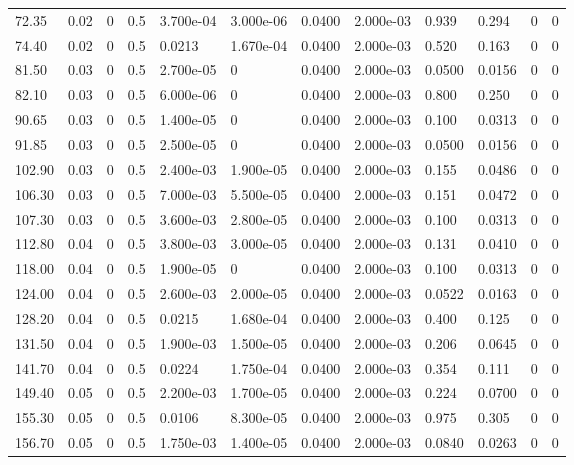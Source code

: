 \documentclass[preview]{standalone}
\begin{document}
{{\begin{tabular}{L{1.2cm}C{1.2cm} C{0.3cm}C{0.5cm} C{1.4cm}C{1.4cm} C{1.4cm}C{1.4cm} C{1.6cm}C{1.6cm} C{1.6cm}C{1.6cm}}
  72.35  &  0.02  & 0     & 0.5 &  3.700e-04  & 3.000e-06  &  0.0400&   2.000e-03& 0.939 & 0.294   &  0 & 0  \\ 
  74.40  &  0.02  & 0     & 0.5 &  0.0213  & 1.670e-04  &  0.0400&   2.000e-03& 0.520 & 0.163   &  0 & 0  \\ 
  81.50  &  0.03  & 0     & 0.5 &  2.700e-05  & 0  &  0.0400&   2.000e-03& 0.0500 & 0.0156   &  0 & 0  \\ 
  82.10  &  0.03  & 0     & 0.5 &  6.000e-06  & 0  &  0.0400&   2.000e-03& 0.800 & 0.250   &  0 & 0  \\ 
  90.65  &  0.03  & 0     & 0.5 &  1.400e-05  & 0  &  0.0400&   2.000e-03& 0.100 & 0.0313   &  0 & 0  \\ 
  91.85  &  0.03  & 0     & 0.5 &  2.500e-05  & 0  &  0.0400&   2.000e-03& 0.0500 & 0.0156   &  0 & 0  \\ 
  102.90  &  0.03  & 0     & 0.5 &  2.400e-03  & 1.900e-05  &  0.0400&   2.000e-03& 0.155 & 0.0486   &  0 & 0  \\ 
  106.30  &  0.03  & 0     & 0.5 &  7.000e-03  & 5.500e-05  &  0.0400&   2.000e-03& 0.151 & 0.0472   &  0 & 0  \\ 
  107.30  &  0.03  & 0     & 0.5 &  3.600e-03  & 2.800e-05  &  0.0400&   2.000e-03& 0.100 & 0.0313   &  0 & 0  \\ 
  112.80  &  0.04  & 0     & 0.5 &  3.800e-03  & 3.000e-05  &  0.0400&   2.000e-03& 0.131 & 0.0410   &  0 & 0  \\ 
  118.00  &  0.04  & 0     & 0.5 &  1.900e-05  & 0  &  0.0400&   2.000e-03& 0.100 & 0.0313   &  0 & 0  \\ 
  124.00  &  0.04  & 0     & 0.5 &  2.600e-03  & 2.000e-05  &  0.0400&   2.000e-03& 0.0522 & 0.0163   &  0 & 0  \\ 
  128.20  &  0.04  & 0     & 0.5 &  0.0215  & 1.680e-04  &  0.0400&   2.000e-03& 0.400 & 0.125   &  0 & 0  \\ 
  131.50  &  0.04  & 0     & 0.5 &  1.900e-03  & 1.500e-05  &  0.0400&   2.000e-03& 0.206 & 0.0645   &  0 & 0  \\ 
  141.70  &  0.04  & 0     & 0.5 &  0.0224  & 1.750e-04  &  0.0400&   2.000e-03& 0.354 & 0.111   &  0 & 0  \\ 
  149.40  &  0.05  & 0     & 0.5 &  2.200e-03  & 1.700e-05  &  0.0400&   2.000e-03& 0.224 & 0.0700   &  0 & 0  \\ 
  155.30  &  0.05  & 0     & 0.5 &  0.0106  & 8.300e-05  &  0.0400&   2.000e-03& 0.975 & 0.305   &  0 & 0  \\ 
  156.70  &  0.05  & 0     & 0.5 &  1.750e-03  & 1.400e-05  &  0.0400&   2.000e-03& 0.0840 & 0.0263   &  0 & 0  \\ 

\end{tabular}}}
\end{document}
